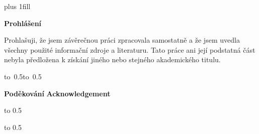 \newpage



\openright
\hypersetup{pageanchor=true}
\pagestyle{plain}
\vglue 0pt plus 1fill

\noindent\medskip
{\large\bfseries Prohlášení}

\noindent
Prohlašuji, že jsem závěrečnou práci zpracovala samostatně a že jsem uvedla všechny použité informační zdroje a literaturu. Tato práce ani její podstatná část nebyla předložena k získání jiného nebo stejného akademického titulu.

\vspace{10mm}

\hbox{\hbox to 0.5\hbox to 0.5}

\vspace{20mm}
\newpage

\openright

\noindent
{\large\bfseries Poděkování}
\DedicationCJ
\vspace{10mm}
\noindent
{\large\bfseries Acknowledgement}
\DedicationAJ

\newpage


\openright

\vbox to 0.5


\newpage


\openright

\vbox to 0.5


\newpage

\openright
\pagestyle{plain}
\setcounter{page}{1}
